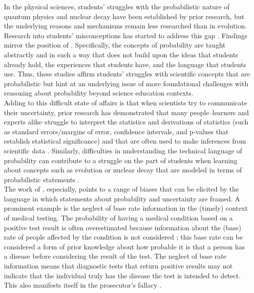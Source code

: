 \documentclass[man, floatsintext]{apa7} %
\begin{document}
In the physical sciences, students' struggles with the probabilistic nature of quantum physics \parencite{br02} and nuclear decay \parencite{smmv17} have been established by prior research, but the underlying reasons and mechanisms remain less researched than in evolution. Research into students’ misconceptions has started to address this gap \parencite{ms15, alra14, st09}. Findings mirror the position of \textcite{bgv94}. Specifically, the concepts of probability are taught abstractly and in such a way that does not build upon the ideas that students already hold, the experiences that students have, and the language that students use. Thus, these studies affirm students' struggles with scientific concepts that are probabilistic but hint at an underlying issue of more foundational challenges with reasoning about probability beyond science education contexts. \\

Adding to this difficult state of affairs is that when scientists try to communicate their uncertainty, prior research has demonstrated that many people–learners and experts alike–struggle to interpret the statistics and derivations of statistics (such as standard errors/margins of error, confidence intervals, and p-values that establish statistical significance) and that are often used to make inferences from scientific data \parencite{gkv04, s07, tk74}. Similarly, difficulties in understanding the technical language of probability can contribute to a struggle on the part of students when learning about concepts such as evolution or nuclear decay that are modeled in terms of probabilistic statements \parencite[e.g.][]{fth17}. \\

The work of \textcite{tk74}, especially, points to a range of biases that can be elicited by the language in which statements about probability and uncertainty are framed. A prominent example is the neglect of base rate information in the (timely) context of medical testing. The probability of having a medical condition based on a positive test result is often overestimated because information about the (base) rate of people affected by the condition is not considered \parencite{kahneman_thinking_2012}; this base rate can be considered a form of prior knowledge about how probable it is that a person has a disease before considering the result of the test. The neglect of base rate information means that diagnostic tests that return positive results may not indicate that the individual truly has the disease the test is intended to detect. This also manifests itself in the prosecutor's fallacy \parencite{thompson1987interpretation}. \\
\end{document}

